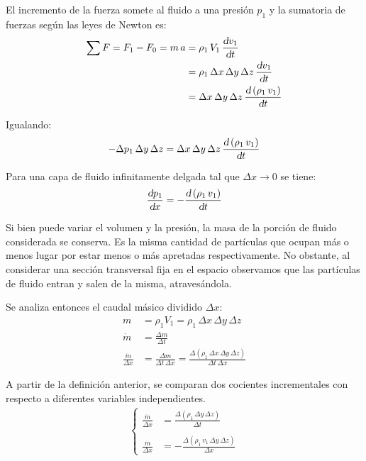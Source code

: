 \documentclass[a5paper,12pt,twoside]{book}
\begin{document}
El incremento de la fuerza somete al fluido a una presión $p_1$ y la sumatoria de fuerzas según las leyes de Newton es:
\begin{align*}
    \sum F = F_1 - F_0  = m \, a &= \rho_1 \, V_1 \, \frac{\textsl{d} v_1}{\textsl{d} t}
    \\
    &= \rho_1 \, \Delta x \, \Delta y \, \Delta z \, \frac{\textsl{d} v_1}{\textsl{d} t}
    \\
    &= \Delta x \, \Delta y \, \Delta z \, \frac{\textsl{d} \left( \rho_1 \, v_1 \right)}{\textsl{d} t}
\end{align*}

Igualando:
\begin{equation}
    - \Delta p_1 \, \Delta y \, \Delta z
    =
    \Delta x \, \Delta y \, \Delta z \, \frac{\textsl{d} \left( \rho_1 \, v_1 \right)}{\textsl{d} t}
    \label{eqn:momentumDelta}
\end{equation}

Para una capa de fluido infinitamente delgada tal que $\Delta x \to 0$ se tiene:
\begin{equation}
    \frac{\textsl{d} p_1}{\textsl{d} x} = - \frac{\textsl{d} \left( \rho_1 \, v_1 \right)}{\textsl{d} t}
    \label{eqn:momentumDif}
\end{equation}

Si bien puede variar el volumen y la presión, la masa de la porción de fluido considerada se conserva.
Es la misma cantidad de partículas que ocupan más o menos lugar por estar menos o más apretadas respectivamente.
No obstante, al considerar una sección transversal fija en el espacio observamos que las partículas de fluido entran y salen de la misma, atravesándola.

Se analiza entonces el caudal másico dividido $\Delta x$:
\begin{align*}
    m &= \rho_1 V_1 = \rho_1 \, \Delta x \, \Delta y \, \Delta z
    \\
    \dot{m} &= \frac{\Delta m}{\Delta t}
    \\
    \frac{\dot{m}}{\Delta x} &= \frac{\Delta m}{\Delta t \, \Delta x}
    = \frac{\Delta \left( \rho_1 \, \Delta x \, \Delta y \, \Delta z \right)}{\Delta t \, \Delta x}
\end{align*}

A partir de la definición anterior, se comparan dos cocientes incrementales con respecto a diferentes variables independientes.
\begin{gather*}
    \left\{
    \begin{aligned}
        \frac{\dot{m}}{\Delta x} &= \frac{\Delta \left( \rho_1 \, \Delta y \, \Delta z \right)}{\Delta t}
        \\
        \\
        \frac{\dot{m}}{\Delta x} &= -\frac{\Delta \left( \rho_1 \, v_1 \, \Delta y \, \Delta z \right)}{\Delta x}
    \end{aligned}
    \right.
\end{gather*}
\end{document}
